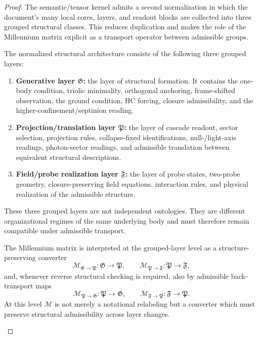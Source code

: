 \begin{proof}
The semantic/tensor kernel admits a second normalization in which the document's
many local cores, layers, and readout blocks are collected into three grouped
structural classes. This reduces duplication and makes the role of the
Millennium matrix explicit as a transport operator between admissible groups.

\begin{definition}
\label{def:grouped-structural-architecture}
The normalized structural architecture consists of the following three grouped
layers:
\begin{enumerate}[leftmargin=2em,label=(G\arabic*)]
\item \textbf{Generative layer $\mathfrak G$:} the layer of structural formation. It
contains the one-body condition, triolic minimality, orthogonal anchoring,
frame-shifted observation, the ground condition, HC forcing, closure
admissibility, and the higher-confinement/septinion reading.
\item \textbf{Projection/translation layer $\mathfrak P$:} the layer of cascade readout,
sector selection, projection rules, collapse-fixed identifications, null-/light-axis
readings, photon-sector readings, and admissible translation between equivalent
structural descriptions.
\item \textbf{Field/probe realization layer $\mathfrak F$:} the layer of probe states,
two-probe geometry, closure-preserving field equations, interaction rules, and
physical realization of the admissible structure.
\end{enumerate}
These three grouped layers are not independent ontologies. They are different
organizational regimes of the same underlying body and must therefore remain
compatible under admissible transport.
\end{definition}

\begin{definition}
\label{def:millennium-transport-grouped-layers}
The Millennium matrix is interpreted at the grouped-layer level as a
structure-preserving converter
\[
\mathcal M_{\mathfrak G\to\mathfrak P}:\mathfrak G\to\mathfrak P,
\qquad
\mathcal M_{\mathfrak P\to\mathfrak F}:\mathfrak P\to\mathfrak F,
\]
and, whenever reverse structural checking is required, also by admissible
back-transport maps
\[
\mathcal M_{\mathfrak P\to\mathfrak G}:\mathfrak P\to\mathfrak G,
\qquad
\mathcal M_{\mathfrak F\to\mathfrak P}:\mathfrak F\to\mathfrak P.
\]
At this level $\mathcal M$ is not merely a notational relabeling but a
converter which must preserve structural admissibility across layer changes.
\end{definition}


\end{proof}

